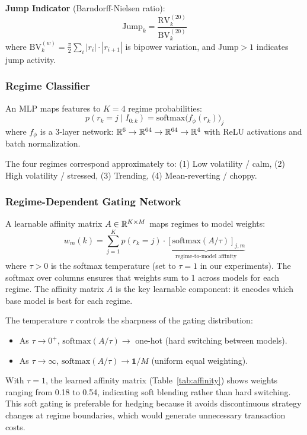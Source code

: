 \textbf{Jump Indicator} (Barndorff-Nielsen ratio):
\begin{equation}
    \mathrm{Jump}_k = \frac{\mathrm{RV}_k^{(20)}}{\mathrm{BV}_k^{(20)}}
\end{equation}
where $\mathrm{BV}_k^{(w)} = \frac{\pi}{2} \sum_{i} |r_i| \cdot |r_{i+1}|$ is bipower variation, and $\mathrm{Jump} > 1$ indicates jump activity.

\subsubsection{Regime Classifier}

An MLP maps features to $K = 4$ regime probabilities:
\begin{equation}
    p(r_k = j \mid I_{0:k}) = \mathrm{softmax}\bigl(f_\phi(r_k)\bigr)_j
\end{equation}
where $f_\phi$ is a 3-layer network: $\mathbb{R}^6 \to \mathbb{R}^{64} \to \mathbb{R}^{64} \to \mathbb{R}^4$ with ReLU activations and batch normalization.

The four regimes correspond approximately to: (1) Low volatility / calm, (2) High volatility / stressed, (3) Trending, (4) Mean-reverting / choppy.

\subsubsection{Regime-Dependent Gating Network}

A learnable affinity matrix $A \in \mathbb{R}^{K \times M}$ maps regimes to model weights:
\begin{equation}
    w_m(k) = \sum_{j=1}^{K} p(r_k = j) \cdot \underbrace{[\mathrm{softmax}(A/\tau)]_{j,m}}_{\text{regime-to-model affinity}}
    \label{eq:gating}
\end{equation}
where $\tau > 0$ is the softmax temperature (set to $\tau = 1$ in our experiments).  The softmax over columns ensures that weights sum to 1 across models for each regime.  The affinity matrix $A$ is the key learnable component: it encodes which base model is best for each regime.

\begin{remark}
The temperature $\tau$ controls the sharpness of the gating distribution:
\begin{itemize}[noitemsep]
    \item As $\tau \to 0^+$, $\mathrm{softmax}(A/\tau) \to$ one-hot (hard switching between models).
    \item As $\tau \to \infty$, $\mathrm{softmax}(A/\tau) \to \mathbf{1}/M$ (uniform equal weighting).
\end{itemize}
With $\tau = 1$, the learned affinity matrix (Table~\ref{tab:affinity}) shows weights ranging from 0.18 to 0.54, indicating soft blending rather than hard switching.  This soft gating is preferable for hedging because it avoids discontinuous strategy changes at regime boundaries, which would generate unnecessary transaction costs.
\end{remark}


